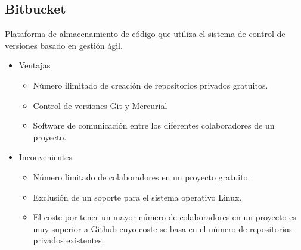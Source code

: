 \subsection{Bitbucket}
Plataforma de almacenamiento de código que utiliza el sistema de control de versiones \nocite{wiki:bitbucket} basado en gestión ágil.
\begin{itemize}
\item Ventajas
\begin{itemize}
\item Número ilimitado de creación de repositorios  privados gratuitos. 
\item Control de versiones Git y Mercurial
\item Software de comunicación entre los diferentes colaboradores de un proyecto.\nocite{redes:bitbucket} 
\end{itemize}
\end{itemize}
\begin{itemize}
\item Inconvenientes
\begin{itemize}
\item Número limitado de colaboradores en un proyecto gratuito. 
\item  Exclusión de un soporte para el sistema operativo Linux.
\item El coste por tener un mayor número de colaboradores en un proyecto es muy superior a Github-cuyo coste se basa en el número de repositorios privados existentes.\nocite{rocreguant:bitbucket} 
\end{itemize}
\end{itemize}


